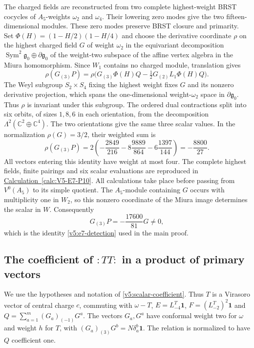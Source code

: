 \documentclass[11pt,a4paper]{amsart}
\numberwithin{equation}{section}
\theoremstyle{definition}
\theoremstyle{remark}
\newcommand{\C}{\mathbb C}
\newcommand{\g}{\mathfrak g}
\newcommand{\Sym}{\operatorname{Sym}}
\begin{document}
The charged fields are reconstructed from two complete highest-weight
BRST cocycles of $A_5$-weights $\omega_2$ and $\omega_4$. Their
lowering zero modes give the two fifteen-dimensional modules. These
zero modes preserve BRST closure and primarity. Set
$\Phi(H)=(1-H/2)(1-H/4)$ and choose the derivative coordinate $\rho$
on the highest charged field $G$ of weight $\omega_2$ in the
equivariant decomposition
$\Sym^2\g_0\oplus\partial\g_0$ of the weight-two subspace of
the affine vertex algebra in the Miura homomorphism.
Since $W_1$ contains no charged module, translation gives
$$
 \rho(G_{(3)}P)=
 \rho\bigl(G_{(3)}\Phi(H)Q-\tfrac12G_{(2)}L_1\Phi(H)Q\bigr).
$$
The Weyl subgroup $S_2\times S_4$ fixing the highest weight fixes $G$
and its nonzero derivative projection, which spans the
one-dimensional weight-$\omega_2$ space in $\partial\g_0$. Thus
$\rho$ is invariant under this subgroup. The ordered dual contractions split into six orbits,
of sizes $1,8,6$ in each orientation, from the decomposition
$\Lambda^2(\C^2\oplus\C^4)$. The two orientations give the same
three scalar values. In the normalization $\rho(G)=3/2$, their
weighted sum is
$$
 \rho(G_{(3)}P)=2\left(-\frac{2849}{216}
           -8\frac{9889}{864}-6\frac{1397}{144}\right)
       =-\frac{8800}{27}.
$$
All vectors entering this identity have weight at most four. The complete highest fields,
finite pairings and six scalar evaluations are reproduced in
\hyperref[calc:V5-E7-P10]{Calculation~\ref*{calc:V5-E7-P10}}.
All calculations take place before passing from $V^0(A_5)$
to its simple quotient.
The $A_5$-module containing $G$ occurs with multiplicity one in $W_2$,
so this nonzero coordinate of the Miura image determines the scalar in $W$. Consequently
$$
                  G_{(3)}P=-\frac{17600}{81}G\ne0,
$$
which is the identity \eqref{v5:e7-detection} used in the main proof.

\subsection{The coefficient of \texorpdfstring{$:TT:$}{:TT:} in a product of primary vectors}
\label{app:virasoro-four}
We use the hypotheses and notation of
\cref{v5:scalar-coefficient}. Thus $T$ is a Virasoro vector of
central charge $c$, commuting with $\omega-T$,
$E=L^T_{-4}\mathbf1$, $F=(L^T_{-2})^2\mathbf1$ and
$Q=\sum_{a=1}^m(G_a)_{(-1)}G^a$. The vectors $G_a,G^a$ have
conformal weight two for $\omega$ and weight $h$ for $T$, with
$(G_a)_{(3)}G^b=N\delta_a^b\mathbf1$.
The relation is normalized to have $Q$ coefficient one.
\end{document}
